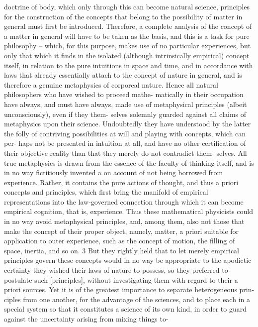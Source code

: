 doctrine of body, which only through this can become natural science,
principles for the construction of the concepts that belong to the possibility
of matter in general must ﬁrst be introduced. Therefore, a complete
analysis of the concept of a matter in general will have to be taken as
the basis, and this is a task for pure philosophy – which, for this purpose,
makes use of no particular experiences, but only that which it ﬁnds in the
isolated (although intrinsically empirical) concept itself, in relation to
the pure intuitions in space and time, and in accordance with laws that
already essentially attach to the concept of nature in general, and is
therefore a genuine metaphysics of corporeal nature.
Hence all natural philosophers who have wished to proceed mathe-
matically in their occupation have always, and must have always, made
use of metaphysical principles (albeit unconsciously), even if they them-
selves solemnly guarded against all claims of metaphysics upon their
science. Undoubtedly they have understood by the latter the folly of
contriving possibilities at will and playing with concepts, which can per-
haps not be presented in intuition at all, and have no other certiﬁcation
of their objective reality than that they merely do not contradict them-
selves. All true metaphysics is drawn from the essence of the faculty of
thinking itself, and is in no way ﬁctitiously invented a on account of not
being borrowed from experience. Rather, it contains the pure actions of
thought, and thus a priori concepts and principles, which ﬁrst bring the
manifold of empirical representations into the law-governed connection
through which it can become empirical cognition, that is, experience.
Thus these mathematical physicists could in no way avoid metaphysical
principles, and, among them, also not those that make the concept of
their proper object, namely, matter, a priori suitable for application to
outer experience, such as the concept of motion, the ﬁlling of space,
inertia, and so on. 3 But they rightly held that to let merely empirical
principles govern these concepts would in no way be appropriate to the
apodictic certainty they wished their laws of nature to possess, so they
preferred to postulate such [principles], without investigating them with
regard to their a priori sources.
Yet it is of the greatest importance to separate heterogeneous prin-
ciples from one another, for the advantage of the sciences, and to place
each in a special system so that it constitutes a science of its own kind,
in order to guard against the uncertainty arising from mixing things to-

